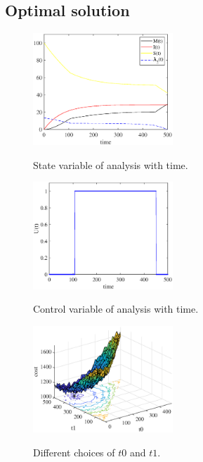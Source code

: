 \subsection{Optimal solution}
\begin{figure}
  \centering
  {\includegraphics[width=0.47\textwidth]{fig/state.eps}}
     \caption{State variable of analysis with time.}
     \label{fig:pe_opt_state_time}
\end{figure}
\begin{figure}
  \centering
  {\includegraphics[width=0.47\textwidth]{fig/Ut.eps}}
     \caption{Control variable of analysis with time.}
     \label{fig:pe_opt_control_Ut}
\end{figure}
\begin{figure}
  \centering
  {\includegraphics[width=0.47\textwidth]{fig/cost_all_t0t1.eps}}
     \caption{Different choices of $t0$ and $t1$.}
     \label{fig:pe_diff_choices}
\end{figure}
